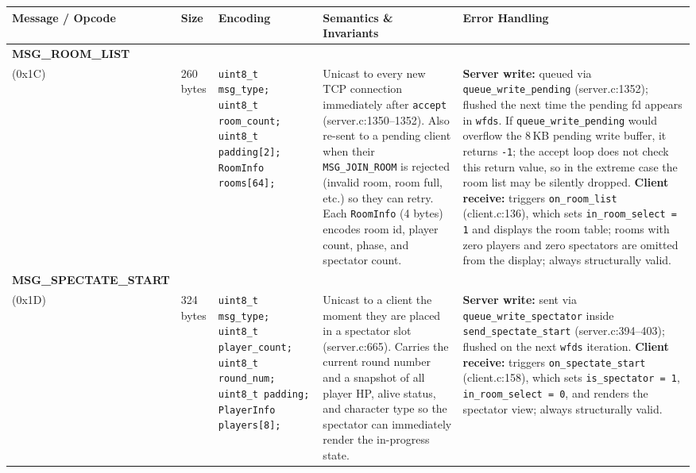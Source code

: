 \documentclass[11pt,letterpaper]{article}
\begin{document}
\begingroup
\small
\begin{longtable}{@{}p{1.8cm} p{1.2cm} p{2.4cm} p{4.2cm} p{4.8cm}@{}}
\toprule
\textbf{Message / Opcode} & \textbf{Size} & \textbf{Encoding} & \textbf{Semantics \& Invariants} & \textbf{Error Handling} \\
\midrule\endhead

\textbf{MSG\_ROOM\_LIST}\\(0x1C) &
260 bytes &
\texttt{uint8\_t msg\_type;}\newline
\texttt{uint8\_t room\_count;}\newline
\texttt{uint8\_t padding[2];}\newline
\texttt{RoomInfo rooms[64];} &
Unicast to every new TCP connection immediately after \texttt{accept} (server.c:1350--1352). Also re-sent to a pending client when their \texttt{MSG\_JOIN\_ROOM} is rejected (invalid room, room full, etc.) so they can retry. Each \texttt{RoomInfo} (4 bytes) encodes room id, player count, phase, and spectator count. &
\textbf{Server write:} queued via \texttt{queue\_write\_pending} (server.c:1352); flushed the next time the pending fd appears in \texttt{wfds}. If \texttt{queue\_write\_pending} would overflow the 8\,KB pending write buffer, it returns \texttt{-1}; the accept loop does not check this return value, so in the extreme case the room list may be silently dropped. \textbf{Client receive:} triggers \texttt{on\_room\_list} (client.c:136), which sets \texttt{in\_room\_select = 1} and displays the room table; rooms with zero players and zero spectators are omitted from the display; always structurally valid. \\[4pt]

\textbf{MSG\_SPECTATE\_START}\\(0x1D) &
324 bytes &
\texttt{uint8\_t msg\_type;}\newline
\texttt{uint8\_t player\_count;}\newline
\texttt{uint8\_t round\_num;}\newline
\texttt{uint8\_t padding;}\newline
\texttt{PlayerInfo players[8];} &
Unicast to a client the moment they are placed in a spectator slot (server.c:665). Carries the current round number and a snapshot of all player HP, alive status, and character type so the spectator can immediately render the in-progress state. &
\textbf{Server write:} sent via \texttt{queue\_write\_spectator} inside \texttt{send\_spectate\_start} (server.c:394--403); flushed on the next \texttt{wfds} iteration. \textbf{Client receive:} triggers \texttt{on\_spectate\_start} (client.c:158), which sets \texttt{is\_spectator = 1}, \texttt{in\_room\_select = 0}, and renders the spectator view; always structurally valid. \\[4pt]


\end{longtable}
\end{document}
